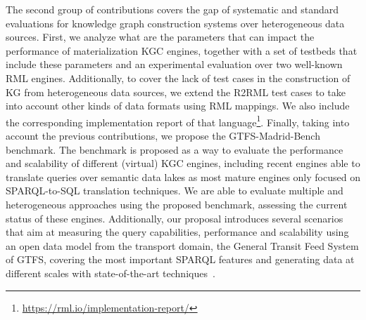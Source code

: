 The second group of contributions covers the gap of systematic and standard evaluations for knowledge graph construction systems over heterogeneous data sources. First, we analyze what are the parameters that can impact the performance of materialization KGC engines, together with a set of testbeds that include these parameters and an experimental evaluation over two well-known RML engines. Additionally, to cover the lack of test cases in the construction of KG from heterogeneous data sources, we extend the R2RML test cases to take into account other kinds of data formats using RML mappings. We also include the corresponding implementation report of that language\footnote{\url{https://rml.io/implementation-report/}}. Finally, taking into account the previous contributions, we propose the GTFS-Madrid-Bench benchmark. The benchmark is proposed as a way to evaluate the performance and scalability of different (virtual) KGC engines, including recent engines able to translate queries over semantic data lakes as most mature engines only focused on SPARQL-to-SQL translation techniques. We are able to evaluate multiple and heterogeneous approaches using the proposed benchmark, assessing the current status of these engines. Additionally, our proposal introduces several scenarios that aim at measuring the query capabilities, performance and scalability using an open data model from the transport domain, the General Transit Feed System of GTFS, covering the most important SPARQL features and generating data at different scales with state-of-the-art techniques~\citep{lantivig}. 



